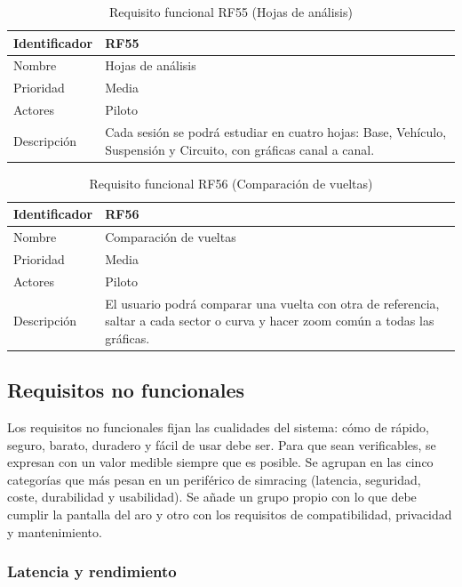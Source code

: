 \begin{table}[H]
	\centering
	\renewcommand{\arraystretch}{2}
	\begin{tabular}{|l|p{10cm}|}
		\hline
		Identificador & RF55 \\
		\hline
		Nombre & Hojas de análisis \\
		\hline
		Prioridad & Media \\
		\hline
		Actores & Piloto \\
		\hline
		Descripción & Cada sesión se podrá estudiar en cuatro hojas: Base, Vehículo, Suspensión y Circuito, con gráficas canal a canal. \\
		\hline
	\end{tabular}
	\caption{Requisito funcional RF55 (Hojas de análisis)}
	\label{tab:rf55}
\end{table}

\begin{table}[H]
	\centering
	\renewcommand{\arraystretch}{2}
	\begin{tabular}{|l|p{10cm}|}
		\hline
		Identificador & RF56 \\
		\hline
		Nombre & Comparación de vueltas \\
		\hline
		Prioridad & Media \\
		\hline
		Actores & Piloto \\
		\hline
		Descripción & El usuario podrá comparar una vuelta con otra de referencia, saltar a cada sector o curva y hacer zoom común a todas las gráficas. \\
		\hline
	\end{tabular}
	\caption{Requisito funcional RF56 (Comparación de vueltas)}
	\label{tab:rf56}
\end{table}

\subsection{Requisitos no funcionales}
\label{subsec:rnf}

Los requisitos no funcionales fijan las cualidades del sistema: cómo de rápido, seguro, barato, duradero y fácil de usar debe ser. Para que sean verificables, se expresan con un valor medible siempre que es posible. Se agrupan en las cinco categorías que más pesan en un periférico de simracing (latencia, seguridad, coste, durabilidad y usabilidad). Se añade un grupo propio con lo que debe cumplir la pantalla del aro y otro con los requisitos de compatibilidad, privacidad y mantenimiento.

\subsubsection{Latencia y rendimiento}

